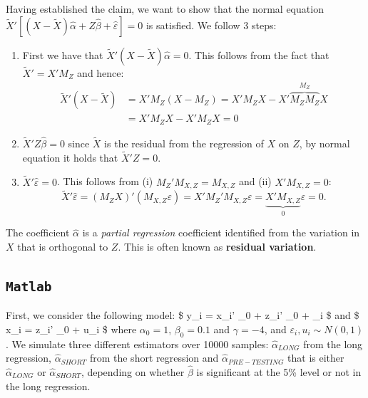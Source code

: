 \documentclass[12pt,]{book}
\begin{document}
Having established the claim, we want to show that the normal equation \(\tilde{X}' \left[ (X - \tilde{X})\hat{\alpha} + Z \hat{\beta} +\hat{\varepsilon} \right] = 0\) is satisfied. We follow 3 steps:

\begin{enumerate}
\def\labelenumi{\arabic{enumi}.}
\item
  First we have that \(\tilde{X}' (X - \tilde{X})\hat{\alpha} = 0\). This follows from the fact that \(\tilde{X}' = X' M_Z\) and hence:
  \[
    \begin{aligned}
    \tilde{X}' (X - \tilde{X})  &  = X' M_Z (X - M_Z) = X' M_Z X - X' \overbrace{M_Z M_Z}^{M_Z} X \\ & = X'M_Z X - X' M_Z X = 0
    \end{aligned}
  \]
\item
  \(\tilde{X}' Z \hat{\beta} = 0\) since \(\tilde{X}\) is the residual from the regression of \(X\) on \(Z\), by normal equation it holds that \(\tilde{X}' Z = 0\).
\item
  \(\tilde{X}' \hat{\varepsilon} = 0\). This follows from (i) \(M_Z ' M_{X, Z} = M_{X,Z}\) and (ii) \(X' M_{X, Z} = 0\):
  \[
    \tilde{X}' \hat{\varepsilon} = (M_Z X)' (M_{X, Z} \varepsilon)  = X'M_Z' M_{X, Z} \varepsilon = \underbrace{X' M_{X, Z}}_0 \varepsilon = 0.
  \]
  \[\tag*{$\blacksquare$}\]
\end{enumerate}

The coefficient \(\hat{\alpha}\) is a \emph{partial regression} coefficient identified from the variation in \(X\) that is orthogonal to \(Z\). This is often known as \textbf{residual variation}.

\hypertarget{matlab-8}{%
\subsection{\texorpdfstring{\texttt{Matlab}}{Matlab}}\label{matlab-8}}

First, we consider the following model: \$ y\_i = x\_i' \alpha\_0 + z\_i' \beta\_0 + \varepsilon\_i \$ and
\$ x\_i = z\_i' \gamma\_0 + u\_i \$ where \(\alpha_0 = 1\), \(\beta_0 = 0.1\) and \(\gamma = -4\), and \(\varepsilon_i, u_i \sim N(0,1)\). We simulate three different estimators over 10000 samples: \(\hat \alpha_{LONG}\) from the long regression, \(\hat \alpha_{SHORT}\) from the short regression and \(\hat \alpha_{PRE-TESTING}\) that is either \(\hat \alpha_{LONG}\) or \(\hat \alpha_{SHORT}\), depending on whether \(\hat \beta\) is significant at the 5\% level or not in the long regression.
\end{document}
